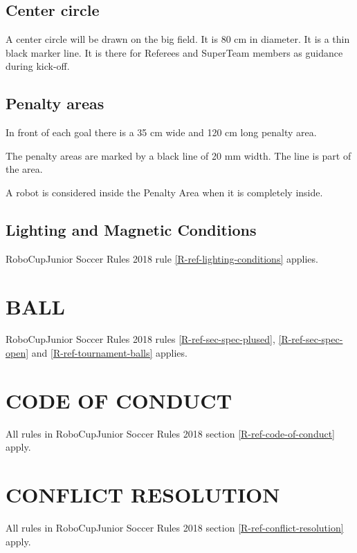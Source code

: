\documentclass{article}
\begin{document}
\subsection{ Center circle \label{ref-035}}

A center circle will be drawn on the big field. It is 80 cm in diameter. It is
a thin black marker line. It is there for Referees and SuperTeam members as
guidance during kick-off.

\subsection{ Penalty areas \label{ref-036}}

In front of each goal there is a 35 cm wide and 120 cm long penalty area.

The penalty areas are marked by a black line of 20 mm width. The line is part of the area.

A robot is considered inside the Penalty Area when it is completely inside.

\subsection{Lighting and Magnetic Conditions \label{ref-037}}


RoboCupJunior Soccer Rules 2018 rule \ref{R-ref-lighting-conditions} applies.

\section{BALL \label{ref-038}}


RoboCupJunior Soccer Rules 2018 rules \ref{R-ref-sec-spec-plused},
\ref{R-ref-sec-spec-open} and \ref{R-ref-tournament-balls} applies.

\section{CODE OF CONDUCT\label{ref-040}}

All rules in RoboCupJunior Soccer Rules 2018  section
\ref{R-ref-code-of-conduct} apply.

\section{CONFLICT RESOLUTION \label{ref-047}}

All rules in RoboCupJunior Soccer Rules 2018  section
\ref{R-ref-conflict-resolution} apply.
\end{document}

